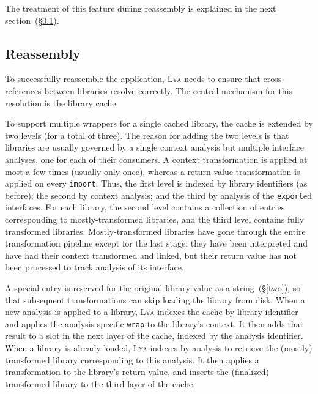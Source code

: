 \documentclass[letterpaper,twocolumn,10pt]{article}
\newcommand{\ttt}[1]{\texttt{#1}}
\newcommand{\sx}[1]{(\S\ref{#1})}
\newcommand{\sys}{{\scshape Lya}\xspace}
\begin{document}
The treatment of this feature during reassembly is explained in the next section~\sx{three}.
  

\subsection{Reassembly}
\label{three}

To successfully reassemble the application, \sys needs to ensure that cross-references between libraries resolve correctly.
The central mechanism for this resolution is the library cache.

To support multiple wrappers for a single cached library, the cache is extended by two levels (for a total of three).
The reason for adding the two levels is that libraries are usually governed by a single context analysis but multiple interface analyses, one for each of their consumers.
A context transformation is applied at most a few times (usually only once), whereas a return-value transformation is applied on every \ttt{import}.
Thus, the first level is indexed by library identifiers (as before); the second by context analysis; and the third by analysis of the \ttt{export}ed interfaces.
For each library, the second level contains a collection of entries corresponding to mostly-transformed libraries, and the third level contains fully transformed libraries.
Mostly-transformed libraries have gone through the entire transformation pipeline except for the last stage:
  they have been interpreted and have had their context transformed and linked, but their return value has not been processed to track analysis of its interface.

A special entry is reserved for the original library value as a string~\sx{two}, so that subsequent transformations can skip loading the library from disk.
When a new analysis is applied to a library, \sys indexes the cache by library identifier and applies the analysis-specific \ttt{wrap} to the library's context.
It then adds that result to a slot in the next layer of the cache, indexed by the analysis identifier.
When a library is already loaded, \sys indexes by analysis to retrieve the (mostly) transformed library corresponding to this analysis.
It then applies a transformation to the library's return value, and inserts the (finalized) transformed library to the third layer of the cache.
\end{document}
